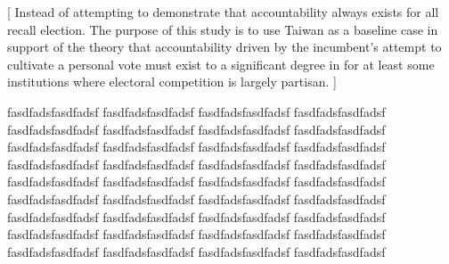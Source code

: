 \documentclass[hyphens, crop=false]{standalone}
\begin{document}
	[
	Instead of attempting to demonstrate that accountability always exists for all recall election.
	The purpose of this study is to use Taiwan as a baseline case in support
	of the theory that accountability driven by the incumbent's attempt to
	cultivate a personal vote must exist to a significant degree
	in for at least some institutions where electoral competition is largely partisan.
	]

		fasdfadsfasdfadsf		fasdfadsfasdfadsf		fasdfadsfasdfadsf		fasdfadsfasdfadsf	
			fasdfadsfasdfadsf		fasdfadsfasdfadsf		fasdfadsfasdfadsf		fasdfadsfasdfadsf		
			fasdfadsfasdfadsf		fasdfadsfasdfadsf		fasdfadsfasdfadsf		fasdfadsfasdfadsf		
			fasdfadsfasdfadsf		fasdfadsfasdfadsf		fasdfadsfasdfadsf		fasdfadsfasdfadsf		
			fasdfadsfasdfadsf		fasdfadsfasdfadsf		fasdfadsfasdfadsf		fasdfadsfasdfadsf		
			fasdfadsfasdfadsf		fasdfadsfasdfadsf		fasdfadsfasdfadsf		fasdfadsfasdfadsf		
			fasdfadsfasdfadsf		fasdfadsfasdfadsf		fasdfadsfasdfadsf		fasdfadsfasdfadsf		
			fasdfadsfasdfadsf		fasdfadsfasdfadsf		fasdfadsfasdfadsf		fasdfadsfasdfadsf		
			fasdfadsfasdfadsf		fasdfadsfasdfadsf		fasdfadsfasdfadsf		fasdfadsfasdfadsf
%	
%	
%	
%	
\end{document}
